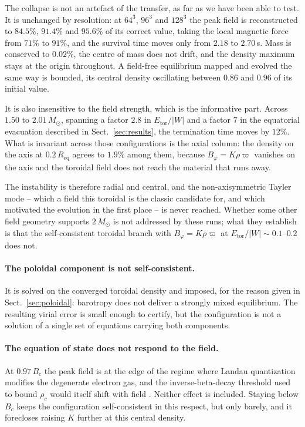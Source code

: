 \documentclass{aa}
\begin{document}
The collapse is not an artefact of the transfer, as far as we have been able to
test. It is unchanged by resolution: at $64^3$, $96^3$ and $128^3$ the peak
field is reconstructed to $84.5\%$, $91.4\%$ and $95.6\%$ of its correct value,
taking the local magnetic force from $71\%$ to $91\%$, and the survival time
moves only from $2.18$ to $2.70$\,s. Mass is conserved to $0.02\%$, the centre
of mass does not drift, and the density maximum stays at the origin throughout.
A field-free equilibrium mapped and evolved the same way is bounded, its
central density oscillating between $0.86$ and $0.96$ of its initial value.

It is also insensitive to the field strength, which is the informative part.
Across $1.50$ to $2.01\,M_\odot$, spanning a factor $2.8$ in
$E_{\mathrm{tor}}/|W|$ and a factor $7$ in the equatorial evacuation described
in Sect.~\ref{sec:results}, the termination time moves by $12\%$. What is
invariant across those configurations is the axial column: the density on the
axis at $0.2\,R_{\mathrm{eq}}$ agrees to $1.9\%$ among them, because
$B_\varphi = K\rho\varpi$ vanishes on the axis and the toroidal field does not
reach the material that runs away.

The instability is therefore radial and central, and the non-axisymmetric
Tayler mode \citep{tayler1973,markey1973} -- which a field this toroidal is
the classic candidate for, and which motivated the evolution in the first
place -- is never reached. Whether some other field geometry supports
$2\,M_\odot$ is not addressed by these runs; what they establish is that the
self-consistent toroidal branch with $B_\varphi = K\rho\varpi$ at
$E_{\mathrm{tor}}/|W| \sim 0.1$--$0.2$ does not.

\paragraph{The poloidal component is not self-consistent.} It is solved
on the converged toroidal density and imposed, for the reason given in
Sect.~\ref{sec:poloidal}: barotropy does not deliver a strongly mixed
equilibrium. The resulting virial error is small enough to certify, but
the configuration is not a solution of a single set of equations carrying
both components.

\paragraph{The equation of state does not respond to the field.} At
$0.97\,B_c$ the peak field is at the edge of the regime where Landau
quantization modifies the degenerate electron gas, and the
inverse-beta-decay threshold used to bound $\rho_c$ would itself shift
with field \citep{das2014}. Neither effect is included. Staying below
$B_c$ keeps the configuration self-consistent in this respect, but only
barely, and it forecloses raising $K$ further at this central density.
\end{document}
